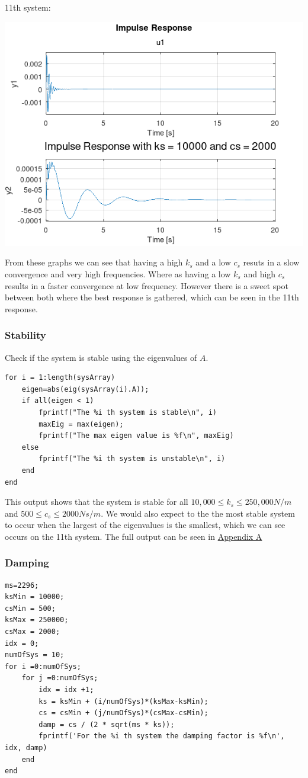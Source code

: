 \documentclass[11pt]{article}
\begin{document}
11th system:
\begin{center}
\includegraphics[width=.9\linewidth]{ENG204-Assignment-2-Impulse-Response-11.png}
\end{center}
From these graphs we can see that having a high \(k_s\) and a low \(c_s\) resuts in a slow convergence and very high frequencies. Where as having a low \(k_s\) and high \(c_s\) results in a faster convergence at low frequency. However there is a sweet spot between both where the best response is gathered, which can be seen in the 11th response.
\subsubsection{Stability}
\label{sec:org6a1b386}
Check if the system is stable using the eigenvalues of \(A\).
\begin{verbatim}
for i = 1:length(sysArray)
    eigen=abs(eig(sysArray(i).A));
    if all(eigen < 1)
        fprintf("The %i th system is stable\n", i)
        maxEig = max(eigen);
        fprintf("The max eigen value is %f\n", maxEig)
    else
        fprintf("The %i th system is unstable\n", i)
    end
end
\end{verbatim}


This output shows that the system is stable for all \(10,000\leq k_s\leq 250,000 N/m\) and \(500 \leq c_s \leq 2000 Ns/m\). We would also expect to the the most stable system to occur when the largest of the eigenvalues is the smallest, which we can see occurs on the 11th system. The full output can be seen in \hyperref[sec:org5ab6351]{Appendix A}
\subsubsection{Damping}
\label{sec:org77cbc0f}
\begin{verbatim}
ms=2296;
ksMin = 10000;
csMin = 500;
ksMax = 250000;
csMax = 2000;
idx = 0;
numOfSys = 10;
for i =0:numOfSys;
    for j =0:numOfSys;
        idx = idx +1;
        ks = ksMin + (i/numOfSys)*(ksMax-ksMin);
        cs = csMin + (j/numOfSys)*(csMax-csMin);
        damp = cs / (2 * sqrt(ms * ks));
        fprintf('For the %i th system the damping factor is %f\n', idx, damp)
    end
end
\end{verbatim}
\end{document}
